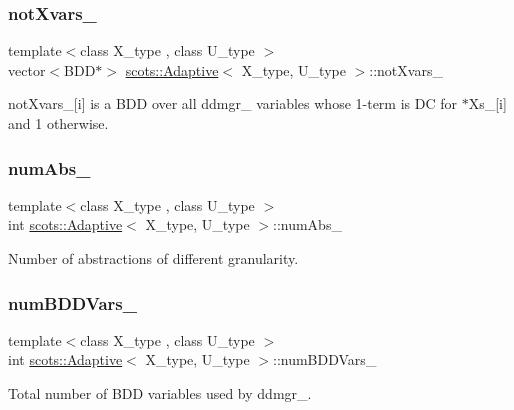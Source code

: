 \subsubsection{\texorpdfstring{not\+Xvars\+\_\+}{notXvars\_}}
{\footnotesize\ttfamily template$<$class X\+\_\+type , class U\+\_\+type $>$ \\
vector$<$B\+DD$\ast$$>$ \hyperlink{classscots_1_1Adaptive}{scots\+::\+Adaptive}$<$ X\+\_\+type, U\+\_\+type $>$\+::not\+Xvars\+\_\+}

not\+Xvars\+\_\+\mbox{[}i\mbox{]} is a B\+DD over all ddmgr\+\_\+ variables whose 1-\/term is DC for $\ast$\+Xs\+\_\+\mbox{[}i\mbox{]} and 1 otherwise. \mbox{\label{classscots_1_1Adaptive_afdd5a499494efeb8538346ad9e0f329c}} 
\subsubsection{\texorpdfstring{num\+Abs\+\_\+}{numAbs\_}}
{\footnotesize\ttfamily template$<$class X\+\_\+type , class U\+\_\+type $>$ \\
int \hyperlink{classscots_1_1Adaptive}{scots\+::\+Adaptive}$<$ X\+\_\+type, U\+\_\+type $>$\+::num\+Abs\+\_\+}

Number of abstractions of different granularity. \mbox{\label{classscots_1_1Adaptive_a753d83283386610f1a2283af5cbeba73}} 
\subsubsection{\texorpdfstring{num\+B\+D\+D\+Vars\+\_\+}{numBDDVars\_}}
{\footnotesize\ttfamily template$<$class X\+\_\+type , class U\+\_\+type $>$ \\
int \hyperlink{classscots_1_1Adaptive}{scots\+::\+Adaptive}$<$ X\+\_\+type, U\+\_\+type $>$\+::num\+B\+D\+D\+Vars\+\_\+}

Total number of B\+DD variables used by ddmgr\+\_\+. \mbox{\label{classscots_1_1Adaptive_abed6bfd1256157d4b943078f6486ee36}} 
